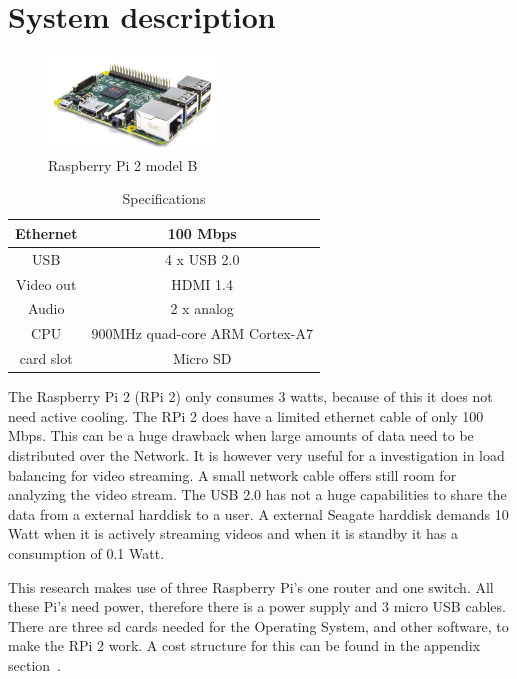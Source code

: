 \documentclass{sig-alternate-br}
\begin{document}
\section{System description}\label{sec:system}

\begin{figure}[H]
	\centering 
	\includegraphics[width=0.4\textwidth]{Pi2ModB1GB_-comp.jpeg}
	\caption{Raspberry Pi 2 model B}
	\label{fig:raspberry} %
\end{figure}
\begin{table}[H]
	\centering \caption{Specifications}
	\begin{tabular}{|c|c|} \hline
		Ethernet & 100 Mbps \\ \hline
		USB & 4 x USB 2.0 \\ \hline
		Video out & HDMI 1.4 \\ \hline
		Audio & 2 x analog \\ \hline
		CPU & 900MHz quad-core ARM Cortex-A7 \\ \hline
		card slot & Micro SD  \\ \hline
	\end{tabular}
	\label{tab:Specificaties}
\end{table}
The Raspberry Pi 2 (RPi 2) only consumes 3 watts, because of this it does not need active cooling. The RPi 2 does have a limited ethernet cable of only 100 Mbps. This can be a huge drawback when large amounts of data need to be distributed over the Network. It is however very useful for a investigation in load balancing for video streaming. A small network cable offers still room for analyzing the video stream. The USB 2.0 has not a huge capabilities to share the data from a external harddisk to a user. A external Seagate harddisk demands 10 Watt when it is actively streaming videos and when it is standby it has a consumption of 0.1  Watt.

This research makes use of three Raspberry Pi's one router and one switch. All these Pi's need power, therefore there is a power supply and 3 micro USB cables. There are three sd cards needed for the Operating System, and other software, to make the RPi 2 work. A cost structure for this can be found in the appendix section~.
\end{document}
